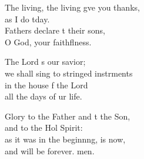 \begin{psalmverse}
\begin{patverse}
The living, the living g\pointup{\i}ve you thanks,\Med\\
as I do tday.\\
Fathers declare t their sons,\Med\\
O God, your faithflness.

The Lord \pointup{\i}s our savior;\Med\\
we shall sing to stringed instrments\\
in the house f the Lord\Med\\
all the days of ur life.

Glory to the Father and t the Son,\Med\\
and to the Hol Spirit:\\
as it was in the beginn\pointup{\i}ng, is now,\Med\\
and will be forever. men. 
  \end{patverse}
\end{psalmverse}
